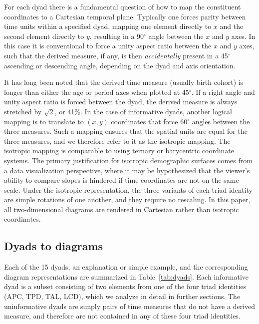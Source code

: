 \documentclass[12pt,oneside,a4paper]{article} %
\begin{document}
For each dyad there is a fundamental question of how to map the constituent
coordinates to a Cartesian temporal plane. Typically one forces parity between time units within
a specified dyad, mapping one element directly to $x$ and the second element
directly to $y$, resulting in a 90$^\circ$ angle between the $x$ and $y$
axes. In this case it is conventional to force a unity aspect ratio
between the $x$ and $y$ axes, such that the derived measure, if any, is then
\textit{accidentally} present in a 45$^\circ$ ascending or descending angle,
depending on the dyad and axis orientation. 

It has long been noted \citep{lexis1875einleitung, perozzo1880della} that the
derived time measure (usually birth cohort) is longer than either the age or period axes when plotted at 45$^\circ$.
If a right angle and unity aspect ratio is forced between the dyad, the derived measure is always stretched by
$\sqrt{2}$, or 41\%. In the case of informative dyads, another
logical mapping is to translate to $(x,y)$ coordinates that force 60$^\circ$
angles between the three measures. Such a mapping ensures that the spatial units are equal for the three measures, and we therefore refer to it as the isotropic mapping. The isotropic mapping
is comparable to using ternary or barycentric coordinate systems. 
The primary justification for isotropic demographic surfaces comes from
a data visualization perspective, where it may be hypothesized that the
 viewer's ability to compare slopes is hindered if time coordinates are not on
 the same scale. Under the isotropic representation, the three variants of each
 triad identity are simple rotations of one another, and they require no
 rescaling. In this paper, all two-dimensional diagrams are rendered in
 Cartesian rather than isotropic coordinates.

\subsection{Dyads to diagrams}
Each of the 15 dyads, an explanation or simple example,
and the corresponding diagram representations are summarized in
Table~\ref{tab:dyads}. Each informative dyad is a subset consisting of two
elements from one of the four triad identities (APC, TPD, TAL, LCD), which we
analyze in detail in further sections. The uninformative dyads are simply pairs
of time measures that do not have a derived measure, and therefore are not
contained in any of these four triad identities.
\pagebreak
\end{document}
